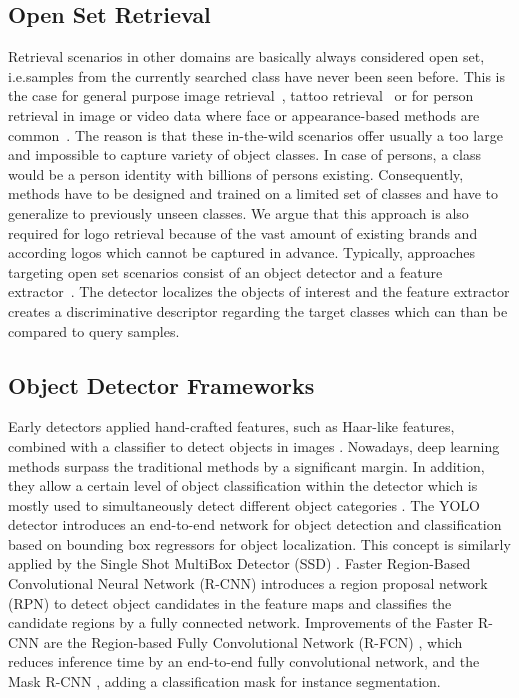 \documentclass[a4paper,twoside]{article}
\newcommand{\xie}{i.e.}
\begin{document}
\subsection{Open Set Retrieval}
Retrieval scenarios in other domains are basically always considered open set, \xie samples from the currently searched class have never been seen before.
This is the case for general purpose image retrieval~\cite{sivic2003}, tattoo retrieval~\cite{manger2012} or for person retrieval in image or video data where face or appearance-based methods are common~\cite{bauml2010,weber2011,herrmann2015b}. The reason is that these in-the-wild scenarios offer usually a too large and impossible to capture variety of object classes. In case of persons, a class would be a person identity with billions of persons existing. Consequently, methods have to be designed and trained on a limited set of classes and have to generalize to previously unseen classes. We argue that this approach is also required for logo retrieval because of the vast amount of existing brands and according logos which cannot be captured in advance.
Typically, approaches targeting open set scenarios consist of an object detector and a feature extractor~\cite{??}. The detector localizes the objects of interest and the feature extractor creates a discriminative descriptor regarding the target classes which can than be compared to query samples.

\subsection{Object Detector Frameworks}
Early detectors applied hand-crafted features, such as Haar-like features, combined with a classifier to detect objects in images \cite{viola2004}. 
Nowadays, deep learning methods surpass the traditional methods by a significant margin. In addition, they allow a certain level of object classification within the detector which is mostly used to simultaneously detect different object categories \cite{sermanet2013}. 
The YOLO detector \cite{redmon2015} introduces an end-to-end network for object detection and classification based on bounding box regressors for object localization. This concept is similarly applied by the Single Shot MultiBox Detector (SSD) \cite{liu2015}. 
Faster Region-Based Convolutional Neural Network (R-CNN) \cite{ren2015} introduces a region proposal network (RPN) to detect object candidates in the feature maps and classifies the candidate regions by a fully connected network. 
Improvements of the Faster R-CNN are the Region-based Fully Convolutional Network (R-FCN) \cite{jifengdai2016b}, which reduces inference time by an end-to-end fully convolutional network, and the Mask R-CNN \cite{he2017}, adding a classification mask for instance segmentation.
\end{document}
